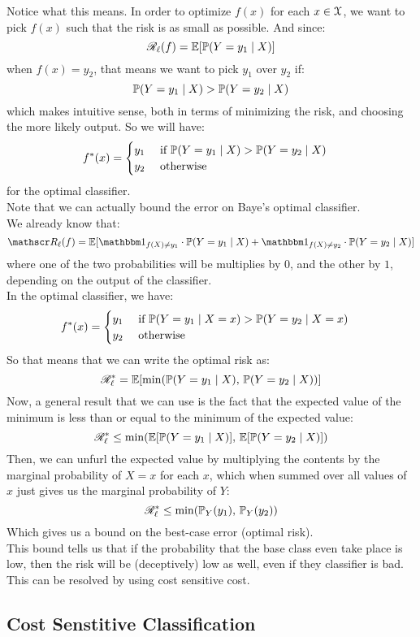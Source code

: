 \documentclass[12pt]{article}
\begin{document}
Notice what this means.
In order to optimize $f(x)$
for each $x \in \mathcal{X}$,
we want to pick $f(x)$
such that the risk is as small as possible.
And since:
\[ \mathscr{R}_\ell(f)
= \mathbb{E}[ \mathbb{P}(Y = y_1 \mid X)] \]
when $f(x) = y_2$,
that means we want to pick $y_1$
over $y_2$ if:
\[ \mathbb{P}(Y = y_1 \mid X) >
\mathbb{P}(Y = y_2 \mid X)  \]
which makes intuitive sense, both in terms 
of minimizing the risk,
and choosing the more likely output.
So we will have:
\[ f^*(x) = \begin{cases} y_1 \quad \text{ if }
\mathbb{P}(Y = y_1 \mid X) >
\mathbb{P}(Y = y_2 \mid X) \\ y_2 \quad \text{ otherwise } \end{cases} \]
for the optimal classifier. \\

Note that we can actually bound the error
on Baye's optimal classifier. \\
We already know that:
\[ \rscr_\ell(f)
= \E[ \indicator_{f(X) \neq y_1}\cdot
\Pb(Y = y_1 \mid X) +
\indicator_{f(X) \neq y_2}\cdot
\Pb(Y = y_2 \mid X)] \]
where one of the two probabilities
will be multiplies by $0$,
and the other by $1$,
depending on the output of the classifier. \\
In the optimal classifier, we have:
\[ f^*(x) = \begin{cases} y_1 \quad \text{ if }
\mathbb{P}(Y = y_1 \mid X = x) >
\mathbb{P}(Y = y_2 \mid X = x) \\ y_2 \quad \text{ otherwise } \end{cases} \]
So that means that we can write the
optimal risk as:
\[ \mathscr{R}_\ell^*
= \mathbb{E}[ \min(
\mathbb{P}(Y = y_1 \mid X), \,
\mathbb{P}(Y = y_2 \mid X))] \]
Now, a general result that we can use
is the fact that the expected value of the
minimum is less than or equal to the minimum
of the expected value:
\[ \mathscr{R}_\ell^* \leq \min(
\mathbb{E}[\mathbb{P}(Y = y_1 \mid X)], \,
\mathbb{E}[\mathbb{P}(Y = y_2 \mid X)]) \]
Then, we can unfurl the expected value
by multiplying the contents by the
marginal probability of $X = x$
for each $x$,
which when summed over all values of $x$
just gives us the marginal probability of $Y$:
\[ \mathscr{R}_\ell^* \leq \min(
\mathbb{P}_Y(y_1), \, \mathbb{P}_Y(y_2)) \]
Which gives us a bound on the best-case error
(optimal risk). \\

This bound tells us that
if the probability that the base class even
take place is low,
then the risk will be (deceptively) low
as well,
even if they classifier is bad. \\

This can be resolved by using
cost sensitive cost. \\

\newpage

\subsection*{Cost Senstitive Classification}
\end{document}
